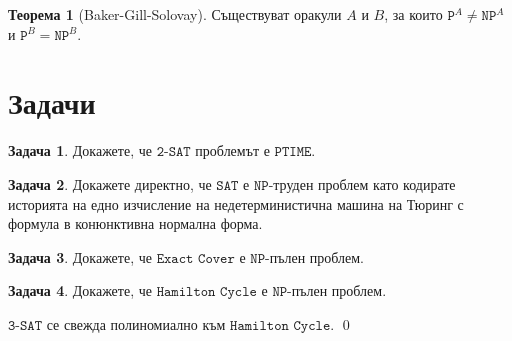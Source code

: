 \documentclass[a4paper]{article}
\theoremstyle{definition}
\newtheorem{theorem}{Теорема}
\newtheorem{problem}{Задача}
\newenvironment{hint}{\noindent{\bf Упътване.}\hspace*{1em}}{\qed\par\vspace*{1em}}
\begin{document}
\begin{theorem}[Baker-Gill-Solovay]
  Съществуват оракули $A$ и $B$, за които $\texttt{P}^A \neq \texttt{NP}^A$ и $\texttt{P}^B = \texttt{NP}^B$.
\end{theorem}



\section{Задачи}


\begin{problem}
  Докажете, че $\texttt{2-SAT}$ проблемът е $\texttt{PTIME}$.
\end{problem}

\begin{problem}
  Докажете директно, че $\texttt{SAT}$ е $\texttt{NP}$-труден проблем
  като кодирате историята на едно изчисление на недетерминистична машина на Тюринг
  с формула в конюнктивна нормална форма.
\end{problem}

\begin{problem}
  Докажете, че $\texttt{Exact Cover}$ е $\texttt{NP}$-пълен проблем.
\end{problem}

\begin{problem}
  Докажете, че $\texttt{Hamilton Cycle}$ е $\texttt{NP}$-пълен проблем.
\end{problem}
\begin{hint}
  $\texttt{3-SAT}$ се свежда полиномиално към $\texttt{Hamilton Cycle}$.
\end{hint}





\end{document}
